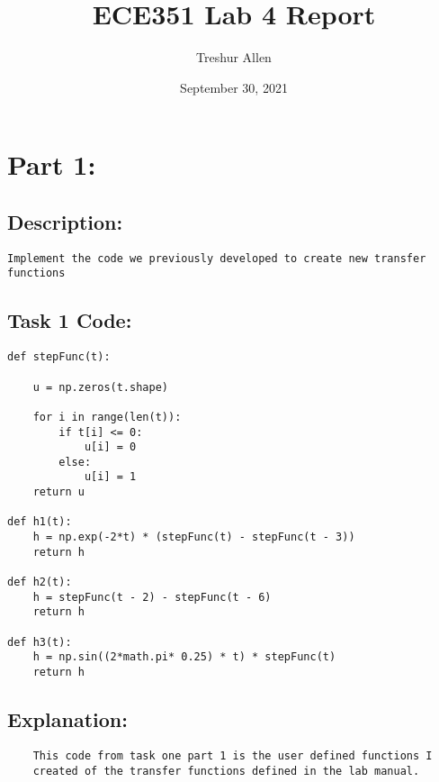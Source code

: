 \documentclass{article}
\title{ECE351 Lab 4 Report}
\author{Treshur Allen }
\date{September 30, 2021}
\begin{document}
\pagebreak

\maketitle

\section{Part 1:}

\subsection{Description:}

\begin{verbatim}
Implement the code we previously developed to create new transfer functions 

\end{verbatim}

\subsection{Task 1 Code:}

\begin{verbatim}
def stepFunc(t):
   
    u = np.zeros(t.shape)
    
    for i in range(len(t)):
        if t[i] <= 0:  
            u[i] = 0
        else:
            u[i] = 1
    return u

def h1(t):
    h = np.exp(-2*t) * (stepFunc(t) - stepFunc(t - 3))
    return h

def h2(t):
    h = stepFunc(t - 2) - stepFunc(t - 6)
    return h

def h3(t):
    h = np.sin((2*math.pi* 0.25) * t) * stepFunc(t)
    return h
\end{verbatim}

\subsection{Explanation:}

\begin{verbatim}
    This code from task one part 1 is the user defined functions I 
    created of the transfer functions defined in the lab manual.
\end{verbatim}

\maketitle
\end{document}
